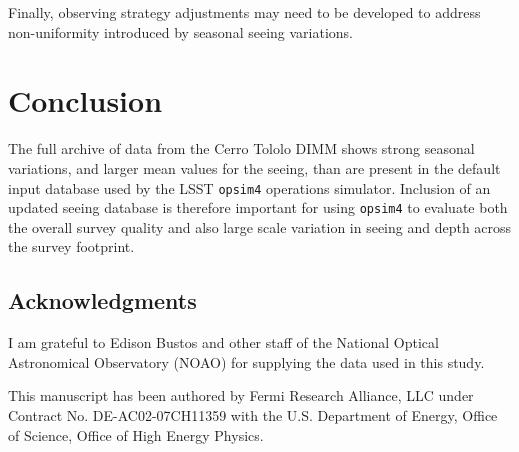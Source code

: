 \documentclass[\docopts]{\docclass}
\begin{document}
Finally, observing strategy adjustments may need to be developed to
address non-uniformity introduced by seasonal seeing variations.



\section{Conclusion}
\label{sec:conclusion}

The full archive of data from the Cerro Tololo DIMM shows strong
seasonal variations, and larger mean values for the seeing, than are
present in the default input database used by the LSST \texttt{opsim4}
operations simulator. Inclusion of an updated seeing database is
therefore important for using \texttt{opsim4} to evaluate both the
overall survey quality and also large scale variation in seeing and
depth across the survey footprint.


\subsection*{Acknowledgments}

I am grateful to Edison Bustos and other staff of the National Optical
Astronomical Observatory (NOAO) for supplying the data used in this
study.

This manuscript has been authored by Fermi Research Alliance, LLC
under Contract No. DE-AC02-07CH11359 with the U.S. Department of
Energy, Office of Science, Office of High Energy Physics.











\end{document}
